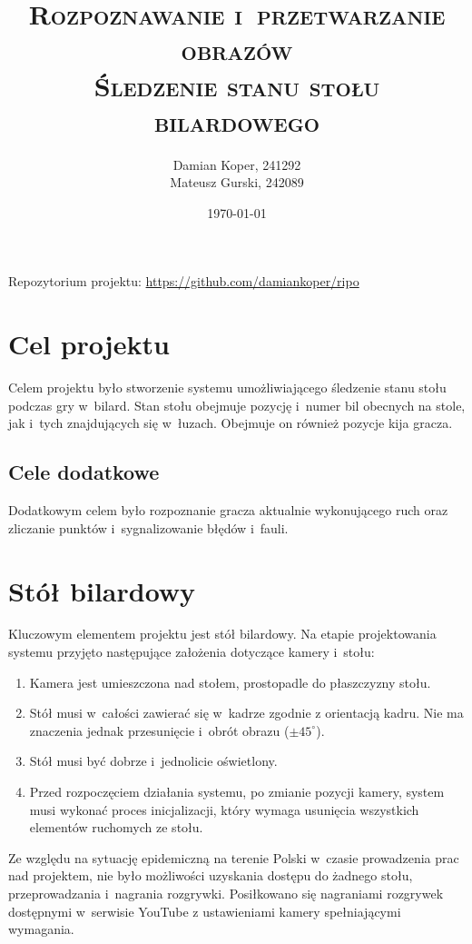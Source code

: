 \documentclass[12pt]{article}
\title{ 
    \vspace*{50mm}
    \textsc{
        \textbf{Rozpoznawanie i~przetwarzanie obrazów}\\
        \large Śledzenie stanu stołu bilardowego 
    }
}
\author{
Damian Koper,  241292\\
Mateusz Gurski, 242089
}
\date{\today}
\begin{document}
\maketitle

\newpage
\setcounter{tocdepth}{2}
\localtableofcontents
\listoffigures
\vfill
Repozytorium projektu: \url{https://github.com/damiankoper/ripo}
\newpage

\section{Cel projektu}
Celem projektu było stworzenie systemu umożliwiającego śledzenie stanu stołu podczas gry w~bilard. Stan stołu obejmuje pozycję i~numer bil obecnych na stole, jak i~tych znajdujących się w~łuzach. Obejmuje on również pozycje kija gracza.

\subsection{Cele dodatkowe}
Dodatkowym celem było rozpoznanie gracza aktualnie wykonującego ruch oraz zliczanie punktów i~sygnalizowanie błędów i~fauli.

\section{Stół bilardowy}

Kluczowym elementem projektu jest stół bilardowy. Na etapie projektowania systemu przyjęto następujące założenia dotyczące kamery i~stołu:

\begin{enumerate}[noitemsep]
    \item Kamera jest umieszczona nad stołem, prostopadle do płaszczyzny stołu.
    \item Stół musi w~całości zawierać się w~kadrze zgodnie z orientacją kadru. Nie ma znaczenia jednak przesunięcie i~obrót obrazu ($\pm45^\circ$).
    \item Stół musi być dobrze i~jednolicie oświetlony.
    \item Przed rozpoczęciem działania systemu, po zmianie pozycji kamery, system musi wykonać proces inicjalizacji, który wymaga usunięcia wszystkich elementów ruchomych ze stołu.
\end{enumerate}

Ze względu na sytuację epidemiczną na terenie Polski w~czasie prowadzenia prac nad projektem, nie było możliwości uzyskania dostępu do żadnego stołu, przeprowadzania i~nagrania rozgrywki. Posiłkowano się nagraniami rozgrywek dostępnymi w~serwisie YouTube z ustawieniami kamery spełniającymi wymagania\cite{youtube}.
\end{document}
